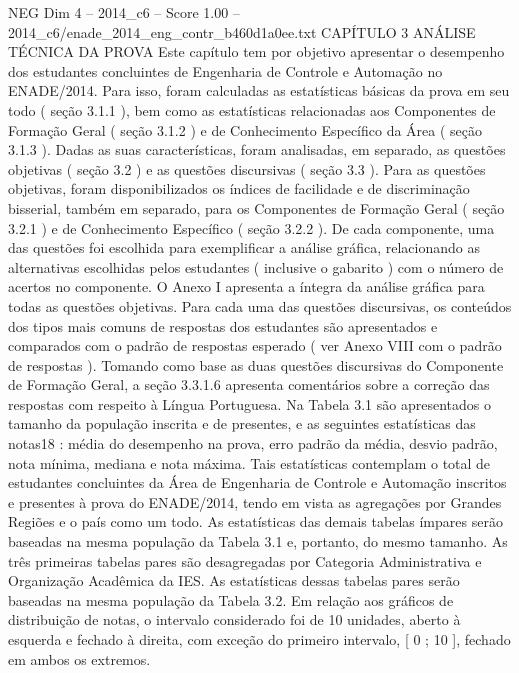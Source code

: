 \begin{textsample}{NEG Dim 4 – 2014\_c6 – Score 1.00 – 2014\_c6/enade\_2014\_eng\_contr\_b460d1a0ee.txt}  \label{ex:f4_neg_280}
CAPÍTULO 3 ANÁLISE TÉCNICA DA PROVA Este capítulo tem por objetivo apresentar o desempenho dos estudantes concluintes de Engenharia de Controle e Automação no ENADE/2014.
Para isso, foram calculadas as estatísticas básicas da prova em seu todo ( seção 3.1.1 ), bem como as estatísticas relacionadas aos Componentes de Formação Geral ( seção 3.1.2 ) e de Conhecimento Específico da Área ( seção 3.1.3 ).
Dadas as suas características, foram analisadas, em separado, as questões objetivas ( seção 3.2 ) e as questões discursivas ( seção 3.3 ).
Para as questões objetivas, foram disponibilizados os índices de facilidade e de discriminação bisserial, também em separado, para os Componentes de Formação Geral ( seção 3.2.1 ) e de Conhecimento Específico ( seção 3.2.2 ).
De cada componente, uma das questões foi escolhida para exemplificar a análise gráfica, relacionando as alternativas escolhidas pelos estudantes ( inclusive o gabarito ) com o número de acertos no componente.
O Anexo I apresenta a íntegra da análise gráfica para todas as questões objetivas.
Para cada uma das questões discursivas, os conteúdos dos tipos mais comuns de respostas dos estudantes são apresentados e comparados com o padrão de respostas esperado ( ver Anexo VIII com o padrão de respostas ).
Tomando como base as duas questões discursivas do Componente de Formação Geral, a seção 3.3.1.6 apresenta comentários sobre a correção das respostas com respeito à Língua Portuguesa.
Na Tabela 3.1 são apresentados o tamanho da população inscrita e de presentes, e as seguintes estatísticas das notas18 : média do desempenho na prova, erro padrão da média, desvio padrão, nota mínima, mediana e nota máxima.
Tais estatísticas contemplam o total de estudantes concluintes da Área de Engenharia de Controle e Automação inscritos e presentes à prova do ENADE/2014, tendo em vista as agregações por Grandes Regiões e o país como um todo.
As estatísticas das demais tabelas ímpares serão baseadas na mesma população da Tabela 3.1 e, portanto, do mesmo tamanho.
As três primeiras tabelas pares são desagregadas por Categoria Administrativa e Organização Acadêmica da IES.
As estatísticas dessas tabelas pares serão baseadas na mesma população da Tabela 3.2.
Em relação aos gráficos de distribuição de notas, o intervalo considerado foi de 10 unidades, aberto à esquerda e fechado à direita, com exceção do primeiro intervalo, [ 0 ; 10 ], fechado em ambos os extremos.

\end{textsample}
